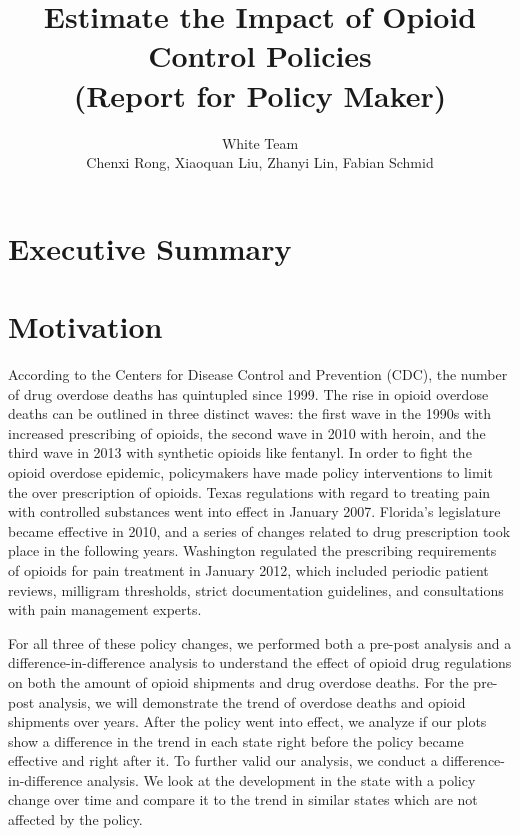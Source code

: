 \documentclass[12pt,letterpaper]{article}
\author{White Team \\ Chenxi Rong, Xiaoquan Liu, Zhanyi Lin, Fabian Schmid}
\title{Estimate the Impact of Opioid Control Policies \\ (Report for Policy Maker)}
\begin{document}
\maketitle

\section*{Executive Summary}

\section{Motivation}
According to the Centers for Disease Control and Prevention (CDC), the number of drug overdose deaths has quintupled since 1999. The rise in opioid overdose deaths can be outlined in three distinct waves: the first wave in the 1990s with increased prescribing of opioids, the second wave in 2010 with heroin, and the third wave in 2013 with synthetic opioids like fentanyl. In order to fight the opioid overdose epidemic, policymakers have made policy interventions to limit the over prescription of opioids. Texas regulations with regard to treating pain with controlled substances went into effect in January 2007. Florida's legislature became effective in 2010, and a series of changes related to drug prescription took place in the following years. Washington regulated the prescribing requirements of opioids for pain treatment in January 2012, which included periodic patient reviews, milligram thresholds, strict documentation guidelines, and consultations with pain management experts.

For all three of these policy changes, we performed both a pre-post analysis and a difference-in-difference analysis to understand the effect of opioid drug regulations on both the amount of opioid shipments and drug overdose deaths. For the pre-post analysis, we will demonstrate the trend of overdose deaths and opioid shipments over years. After the policy went into effect, we analyze if our plots show a difference in the trend in each state right before the policy became effective and right after it. To further valid our analysis, we conduct a difference-in-difference analysis. We look at the development in the state with a policy change over time and compare it to the trend in similar states which are not affected by the policy.
\end{document}
